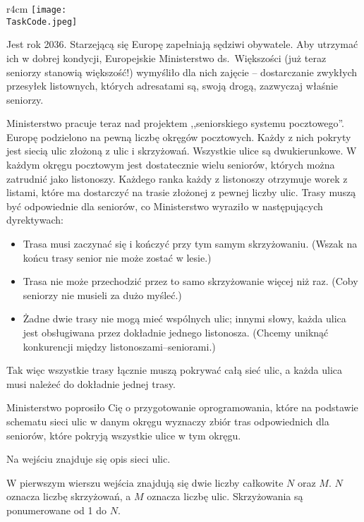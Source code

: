 \documentclass{boi2014-pl}
\renewcommand{\TaskCode}{postmen}
\begin{document}
    \begin{wrapfigure}[8]{r}{4cm}
        \vspace{-18pt}
		\texttt{[image: \\TaskCode.jpeg]}
	\end{wrapfigure}
    Jest rok 2036.
    Starzejącą się Europę zapełniają sędziwi obywatele.
    Aby utrzymać ich w dobrej kondycji, Europejskie Ministerstwo ds.\ Większości
    (już teraz seniorzy stanowią większość!) wymyśliło dla nich zajęcie -- dostarczanie
    zwykłych przesyłek listownych, których adresatami są, swoją drogą, zazwyczaj właśnie seniorzy.

    Ministerstwo pracuje teraz nad projektem ,,seniorskiego systemu pocztowego''.
    Europę podzielono na pewną liczbę okręgów pocztowych.
    Każdy z nich pokryty jest siecią ulic złożoną z ulic i skrzyżowań.
    Wszystkie ulice są dwukierunkowe.
    W każdym okręgu pocztowym jest dostatecznie wielu seniorów, których można zatrudnić
    jako listonoszy.
    Każdego ranka każdy z listonoszy otrzymuje worek z listami, które ma dostarczyć
    na trasie złożonej z pewnej liczby ulic.
    Trasy muszą być odpowiednie dla seniorów, co Ministerstwo wyraziło
    w następujących dyrektywach:

    \begin{itemize}
        \item Trasa musi zaczynać się i kończyć przy tym samym skrzyżowaniu.
          (Wszak na końcu trasy senior nie może zostać w lesie.)
        \item Trasa nie może przechodzić przez to samo skrzyżowanie więcej niż raz.
          (Coby seniorzy nie musieli za dużo myśleć.)
        \item Żadne dwie trasy nie mogą mieć wspólnych ulic;
          innymi słowy, każda ulica jest obsługiwana przez
          dokładnie jednego listonosza.
          (Chcemy uniknąć konkurencji między listonoszami--seniorami.)
    \end{itemize}

    Tak więc wszystkie trasy łącznie muszą pokrywać całą sieć ulic, a każda ulica musi należeć
    do dokładnie jednej trasy.

    \Task
    Ministerstwo poprosiło Cię o przygotowanie oprogramowania, które
    na podstawie schematu sieci ulic w danym okręgu wyznaczy zbiór tras
    odpowiednich dla seniorów, które pokryją wszystkie ulice w tym okręgu.

    \Input
    Na wejściu znajduje się opis sieci ulic.

    W pierwszym wierszu wejścia znajdują się dwie liczby całkowite $N$ oraz $M$.
    $N$ oznacza liczbę skrzyżowań, a $M$ oznacza liczbę ulic.
    Skrzyżowania są ponumerowane od 1 do $N$.
\end{document}
